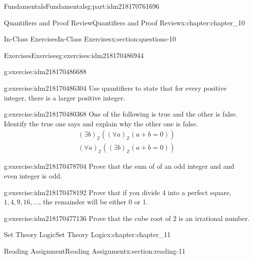 \documentclass[oneside,10pt,]{book}
\numberwithin{equation}{section}
\begin{document}
\begin{partptx}{Fundamentals}{}{Fundamentals}{}{}{g:part:idm218170761696}
\begin{chapterptx}{Quantifiers and Proof Review}{}{Quantifiers and Proof Review}{}{}{x:chapter:chapter_10}
\begin{sectionptx}{In-Class Exercises}{}{In-Class Exercises}{}{}{x:section:questions-10}
\begin{exercises-subsection-numberless}{Exercises}{}{Exercises}{}{}{g:exercises:idm218170486944}
\begin{exercisegroup}
\begin{divisionexerciseeg}{1}{}{}{g:exercise:idm218170486688}
\begin{enumerate}[label=(\alph*)]
\end{enumerate}
%
\end{divisionexerciseeg}%
\begin{divisionexerciseeg}{2}{}{}{g:exercise:idm218170486304}%
Use quantifiers to state that for every positive integer, there is a larger positive integer.%
\end{divisionexerciseeg}%
\begin{divisionexerciseeg}{3}{}{}{g:exercise:idm218170480368}%
One of the following is true and the other is false.  Identify the true one says and explain why the other one is false.%
\begin{gather*}
(\exists  b)_{\mathbb{Z}} ((\forall a)_{\mathbb{Z}}(a + b = 0))\\
(\forall  a)_{\mathbb{Z}} ((\exists b)_{\mathbb{Z}}(a + b = 0))
\end{gather*}
%
\end{divisionexerciseeg}%
\begin{divisionexerciseeg}{4}{}{}{g:exercise:idm218170478704}%
Prove that the sum of of an odd integer and and even integer is odd.%
\end{divisionexerciseeg}%
\begin{divisionexerciseeg}{5}{}{}{g:exercise:idm218170478192}%
Prove that if you divide 4 into a perfect square, \(1, 4, 9, 16, \dots\), the remainder will be either 0 or 1.%
\end{divisionexerciseeg}%
\begin{divisionexerciseeg}{6}{}{}{g:exercise:idm218170477136}%
Prove that the cube root of \(2\) is an irrational number.%
\end{divisionexerciseeg}%
\end{exercisegroup}
\par\medskip\noindent
\end{exercises-subsection-numberless}
\end{sectionptx}
\end{chapterptx}
%
\typeout{************************************************}
\typeout{************************************************}
%
\begin{chapterptx}{Set Theory Logic}{}{Set Theory Logic}{}{}{x:chapter:chapter_11}
%
%
\typeout{************************************************}
\typeout{************************************************}
%
\begin{sectionptx}{Reading Assignment}{}{Reading Assignment}{}{}{x:section:reading-11}

\end{sectionptx}
\end{chapterptx}
\end{partptx}
\end{document}
